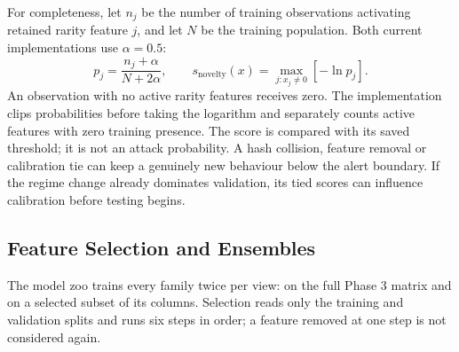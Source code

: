 \documentclass[11pt,a4paper]{article}
\begin{document}
For completeness, let \(n_j\) be the number of training observations activating retained rarity feature \(j\), and let \(N\) be the training population. Both current implementations use \(\alpha=0.5\):
\begin{equation}
\label{eq:token-novelty}
p_j=\frac{n_j+\alpha}{N+2\alpha},\qquad
s_{\mathrm{novelty}}(x)=\max_{j:x_j\ne0}\left[-\ln p_j\right].
\end{equation}
An observation with no active rarity features receives zero. The implementation clips probabilities before taking the logarithm and separately counts active features with zero training presence. The score is compared with its saved threshold; it is not an attack probability. A hash collision, feature removal or calibration tie can keep a genuinely new behaviour below the alert boundary. If the regime change already dominates validation, its tied scores can influence calibration before testing begins.

\subsection{Feature Selection and Ensembles}\label{sec:selection}

The model zoo trains every family twice per view: on the full Phase 3 matrix and on a selected subset of its columns. Selection reads only the training and validation splits and runs six steps in order; a feature removed at one step is not considered again.
\end{document}
